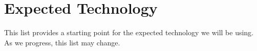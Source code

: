 \documentclass{article}
\begin{document}
\section{Expected Technology}





This list provides a starting point for the expected technology we will be using. As we progress, this list may change.
\end{document}
